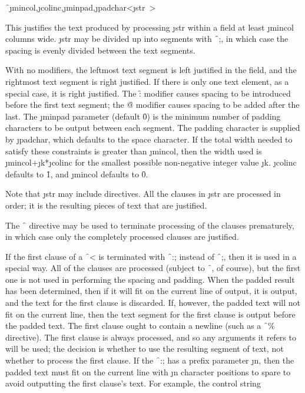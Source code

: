 
\f{~\j{mincol},\j{colinc},\j{minpad},\j{padchar}<\j{str}~>}

This justifies the text produced by processing \j{str}
within a field at least \j{mincol} columns wide.  \j{str}
may be divided up into segments with \f{~;}, in which case the
spacing is evenly divided between the text segments.

With no modifiers, the leftmost text segment is left justified in the
field, and the rightmost text segment is right justified.  If there is
only one text element, as a special case, it is right justified.
The \f{:} modifier causes                                            
spacing to be introduced before the first text segment;  the 
\f{@} modifier causes spacing to be added after the last.
The \j{minpad} parameter (default \f{0}) is the minimum number of
padding characters to be output between each segment.
The padding character is supplied by \j{padchar},
which defaults to the space character.
If the total width needed to satisfy these constraints is greater
than \j{mincol}, then the width used is \j{mincol}+\j{k}*\j{colinc}
for the smallest possible non-negative integer value \j{k}.
\j{colinc} defaults to \f{1}, and \j{mincol} defaults to \f{0}.

Note that \j{str} may include  directives.
All the clauses in \j{str} are processed in order;
it is the resulting pieces of text that are justified.

The \f{~\hat } directive may be used to terminate processing of the
clauses prematurely, in which case only the completely processed clauses
are justified.

If the first clause of a \f{~<} 
is terminated with \f{~:;} instead of
\f{~;}, then it is used in a special way.  All of the clauses are
processed (subject to \f{~\hat }, of course), but the 
first one is not used
in performing the spacing and padding.  When the padded result has been
determined, then if it will fit on the current line of output, it is
output, and the text for the first clause is discarded.  If, however, the
padded text will not fit on the current line, then the text segment for
the first clause is output before the padded text.  The first clause
ought to contain a newline (such as a \f{~\%} directive).  The first
clause is always processed, and so any arguments it refers to will be
used; the decision is whether to use the resulting segment of text, not
whether to process the first clause.  If the \f{~:;} has a prefix
parameter \j{n}, then the padded text must fit on the current line with
\j{n} character positions to spare to avoid outputting the first clause's
text.  For example, the control string

